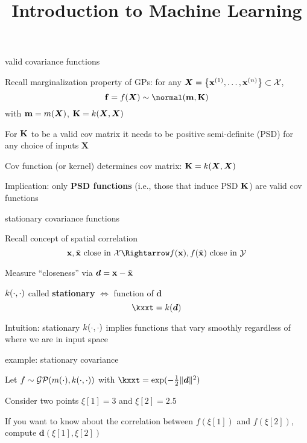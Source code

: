 \documentclass[11pt,compress,t,notes=noshow, xcolor=table]{beamer}
\title{Introduction to Machine Learning}
\begin{document}

\begin{framei}[sep=L]{valid covariance functions}
\item Recall marginalization property of GPs: for any $\bm{X} = \left\{ \mathbf{x}^{(1)}, \ldots, \mathbf{x}^{(n)}\right\} \subset \mathcal{X}$,
$$\fv = \fX \sim \Nmk$$
with $\mathbf{m} = m(\bm{X})$, $\mathbf{K} = k(\bm{X}, \bm{X})$
\item For $\mathbf{K}$ to be a valid cov matrix it needs to be positive semi-definite (PSD) for any choice of inputs $\bm{X}$
\item Cov function (or kernel) determines cov matrix: $\mathbf{K} = k(\bm{X}, \bm{X})$
\item Implication: only \textbf{PSD functions} (i.e., those that induce PSD $\mathbf{K}$) are valid cov functions 
\end{framei}

\begin{framei}[sep=L]{stationary covariance functions}
\item Recall concept of spatial correlation
$$\xv, \xtil \text{ close in } \Xspace \Rightarrow \fx, f(\xtil) \text{ close in } \Yspace$$
\item Measure ``closeness'' via $\bm{d} = \mathbf{x} - \tilde{\mathbf{x}}$
\item $k(\cdot, \cdot)$ called \textbf{stationary} $\Leftrightarrow$ function of $\bm{d}$ 
$$\kxxt = k(\bm{d})$$
\item Intuition: stationary $k(\cdot, \cdot)$ implies functions that vary smoothly regardless of where we are in input space
\end{framei}

\begin{framei}{example: stationary covariance}
\item Let $f \sim \mathcal{GP}(m(\cdot), k(\cdot, \cdot))$ with $\kxxt = \exp(-\tfrac{1}{2}\|\bm{d}\|^2)$
\item Consider two points $\xi[1] = 3$ and $\xi[2] = 2.5$
\item If you want to know about the correlation between $f(\xi[1])$ and $f(\xi[2])$, compute $\bm{d}(\xi[1], \xi[2])$
\vfill
{}
\end{framei}
\end{document}
